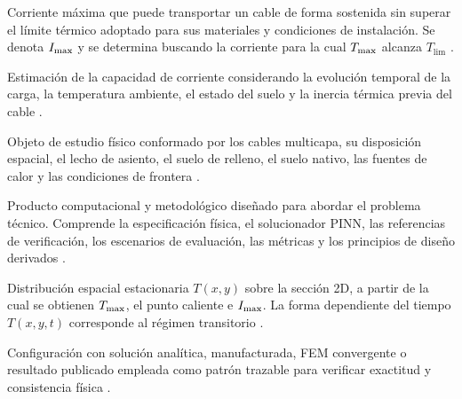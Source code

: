 \begingroup
{}
\renewcommand*\descriptionlabel[1]{\refstepcounter{terminodefinicion}\normalfont\bfseries\thesection.\theterminodefinicion. #1}
\begin{description}[style=nextline,itemsep=0.5\baselineskip,parsep=0pt,topsep=0.25\baselineskip]
  \item[Ampacidad.] Corriente máxima que puede transportar un cable de forma sostenida sin superar el límite térmico adoptado para sus materiales y condiciones de instalación. Se denota $I_{\max}$ y se determina buscando la corriente para la cual $T_{\max}$ alcanza $T_{\mathrm{lim}}$ \parencites[752--760]{neher1957}{anders2005}[cláusulas~4--5]{iec60287}[3--6]{enescu2021}.

  \item[Ampacidad dinámica (DTR).] Estimación de la capacidad de corriente considerando la evolución temporal de la carga, la temperatura ambiente, el estado del suelo y la inercia térmica previa del cable \parencites[cláusulas~2--4]{iec60853}[3--6]{enescu2021}[14843--14845]{fariz2026}.

  \item[Arreglo de cables--entorno térmico.] Objeto de estudio físico conformado por los cables multicapa, su disposición espacial, el lecho de asiento, el suelo de relleno, el suelo nativo, las fuentes de calor y las condiciones de frontera \parencites[752--760]{neher1957}{anders2005}[3--5]{enescu2020}[4--6]{enescu2021}[1,10,16]{kim2025}.

  \item[Artefacto.] Producto computacional y metodológico diseñado para abordar el problema técnico. Comprende la especificación física, el solucionador PINN, las referencias de verificación, los escenarios de evaluación, las métricas y los principios de diseño derivados \parencites[55--56]{peffers2007}[342--350]{gregor2013}.

  \item[Campo de temperatura.] Distribución espacial estacionaria $T(x,y)$ sobre la sección 2D, a partir de la cual se obtienen $T_{\max}$, el punto caliente e $I_{\max}$. La forma dependiente del tiempo $T(x,y,t)$ corresponde al régimen transitorio \parencites{carslaw1959conduction,kakac2018heatConduction,hahn2012heatConduction}[1,3,16]{pan2025}.

  \item[Caso de referencia (\textit{benchmark}).] Configuración con solución analítica, manufacturada, FEM convergente o resultado publicado empleada como patrón trazable para verificar exactitud y consistencia física \parencites{cigre2022}[93--99]{cigre2025}.


\end{description}
